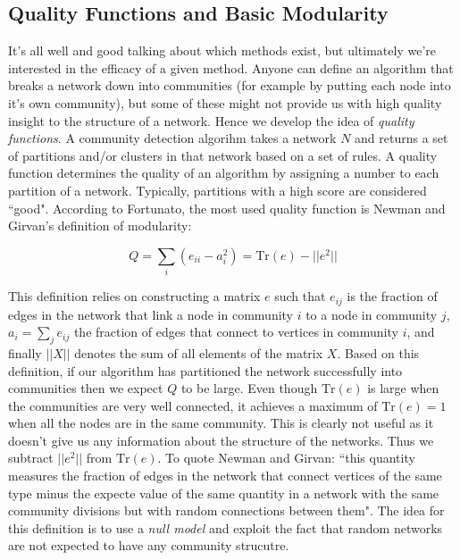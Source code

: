 \subsection{Quality Functions and Basic Modularity}\label{sec:qfs and modularity}
It's all well and good talking about which methods exist, but ultimately we're interested in the efficacy of a given method. Anyone can define an algorithm that breaks a network down into communities (for example by putting each node into it's own community), but some of these might not provide us with high quality insight to the structure of a network. Hence we develop the idea of \emph{quality functions}. A community detection algorihm takes a network $N$ and returns a set of partitions and/or clusters in that network based on a set of rules. A quality function determines the quality of an algorithm by assigning a number to each partition of a network. Typically, partitions with a high score are considered ``good". According to Fortunato, the most used quality function is Newman and Girvan's definition of modularity\cite[8]{newman_girvan}:

$$ Q = \sum_i (e_{ii} - a_i^2) = \text{Tr}(e) - ||e^2|| $$

This definition relies on constructing a matrix $e$ such that $e_{ij}$ is the fraction of edges in the network that link a node in community $i$ to a node in community $j$, $a_i = \sum_j e_{ij}$ the fraction of edges that connect to vertices in community $i$, and finally $||X||$ denotes the sum of all elements of the matrix $X$. Based on this definition, if our algorithm has partitioned the network successfully into communities then we expect $Q$ to be large. Even though $\text{Tr}(e)$ is large when the communities are very well connected, it achieves a maximum of $\text{Tr}(e) = 1$ when all the nodes are in the same community. This is clearly not useful as it doesn't give us any information about the structure of the networks. Thus we subtract $||e^2||$ from $\text{Tr}(e)$. To quote Newman and Girvan: ``this quantity measures the fraction of edges in the network that connect vertices of the same type minus the expecte value of the same quantity in a network with the same community divisions but with random connections between them". The idea for this definition is to use a \emph{null model} and exploit the fact that random networks are not expected to have any community strucutre.


